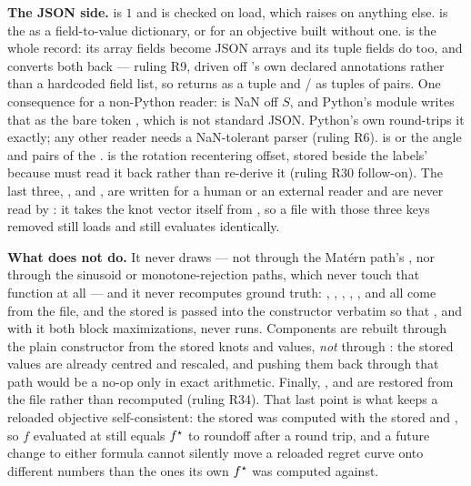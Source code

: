 \textbf{The JSON side.}  is $1$ and is checked on load, which
raises  on anything else.  is the
 as a field-to-value dictionary, or  for an
objective built without one.  is the whole 
record: its array fields become JSON arrays and its tuple fields do too, and
 converts both back --- ruling R9, driven off 's own
declared annotations rather than a hardcoded field list, so  returns
as a tuple and / as tuples of pairs. One
consequence for a non-Python reader:  is NaN off $S$, and
Python's  module writes that as the bare token , which
is not standard JSON\@. Python's own  round-trips it exactly;
any other reader needs a NaN-tolerant parser (ruling R6).  is
 or the angle and pairs of the . 
is the rotation recentering offset, stored beside the labels' 
because  must read it back rather than re-derive it (ruling R30
follow-on). The last three, ,  and
, are written for a human or an external reader and are
never read by : it takes the knot vector itself from
, so a file with those three keys removed still loads and
still evaluates identically.

\textbf{What  does not do.} It never draws --- not through the
Mat\'ern path's , nor through the sinusoid or
monotone-rejection paths, which never touch that function at all --- and it
never recomputes ground truth: , ,
, , ,  and 
all come from the file, and the stored  is passed into the
constructor verbatim so that , and with it both block
maximizations, never runs. Components are rebuilt through the plain
 constructor from the stored knots and values, \emph{not}
through : the stored values are already centred and rescaled,
and pushing them back through that path would be a no-op only in exact
arithmetic. Finally, ,  and  are
restored from the file rather than recomputed (ruling R34). That last point is
what keeps a reloaded objective self-consistent: the stored 
was computed with the stored  and , so $f$ evaluated
at  still equals $f^\star$ to roundoff after a round
trip, and a
future change to either formula cannot silently move a reloaded regret curve
onto different numbers than the ones its own $f^\star$ was computed against.

